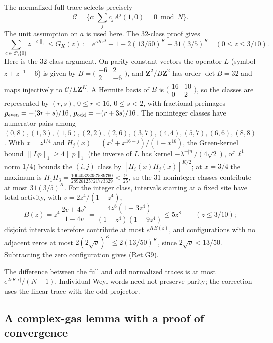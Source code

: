The normalized full trace selects precisely
\[
 \mathcal C=\{c:\sum_jc_jA^j(1,0)=0\bmod N\}.
\]
The unit assumption on \(a\) is used here. The 32-class proof gives
\[
 \sum_{c\in\mathcal C\setminus\{0\}}z^{\|c\|_1}
 \le G_K(z):=e^{5Kz^8}-1+2(13/50)^K+31(3/5)^K
 \quad(0\le z\le3/10).                                    \tag{Ret.G9}
\]
Here is the 32-class argument. On parity-constant vectors the
operator \(L\) (symbol \(z+z^{-1}-6\)) is given by
\(B=\bigl(\begin{smallmatrix}-6&2\\2&-6\end{smallmatrix}\bigr)\),
and \(\mathbf Z^2/B\mathbf Z^2\) has order \(\det B=32\) and maps
injectively to \(\mathcal C/L\mathbf Z^K\). A Hermite basis of
\(B\) is \(\bigl(\begin{smallmatrix}16&10\\0&2\end{smallmatrix}\bigr)\),
so the classes are represented by \((r,s)\), \(0\le r<16\),
\(0\le s<2\), with fractional preimages
\(p_{\rm even}=-(3r+s)/16\), \(p_{\rm odd}=-(r+3s)/16\).
The noninteger classes have numerator pairs among
\((0,8),(1,3),(1,5),(2,2),(2,6),(3,7),(4,4),(5,7),(6,6),(8,8)\).
With \(x=z^{1/4}\) and \(H_j(x)=(x^j+x^{16-j})/(1-x^{16})\), the
Green-kernel bound \(\|Lp\|_1\ge4\|p\|_1\) (the inverse of \(L\)
has kernel \(-\lambda^{-|n|}/(4\sqrt2)\), of \(\ell^1\) norm
\(1/4\)) bounds the \((i,j)\) class by \([H_i(x)H_j(x)]^{K/2}\);
at \(x=3/4\) the maximum is
\(H_1H_3=\frac{10040323357589760}{28926125721773329}<\frac9{25}\),
so the 31 noninteger classes contribute at most \(31(3/5)^K\).
For the integer class, intervals starting at a fixed site have
total activity, with \(v=2z^4/(1-z^4)\),
\[
B(z)=z^4\,\frac{2v+4v^2}{1-4v}
    =\frac{4z^8(1+3z^4)}{(1-z^4)(1-9z^4)}\le5z^8
\qquad(z\le3/10);
\]
disjoint intervals therefore contribute at most \(e^{KB(z)}\), and
configurations with no adjacent zeros at most
\(2(2\sqrt v)^K\le2(13/50)^K\), since \(2\sqrt v<13/50\).
Subtracting the zero configuration gives (Ret.G9).

The difference between the full and odd normalized traces is at most
\(e^{2rK|\epsilon|}/(N-1)\). Individual Weyl words need not preserve parity;
the correction uses the linear trace with the odd projector.

\hypertarget{a-complex-gas-lemma-with-a-proof-of-convergence}{%
\subsection{A complex-gas lemma with a proof of convergence}\label{a-complex-gas-lemma-with-a-proof-of-convergence}}

